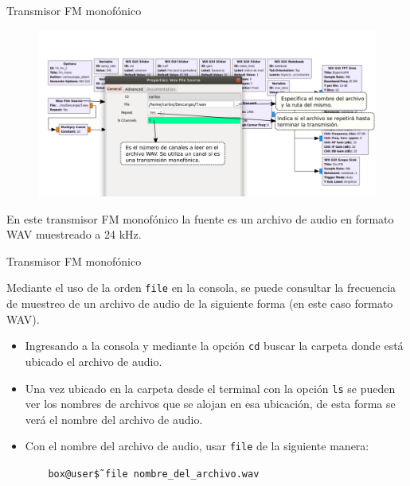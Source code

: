 \begin{frame}{Transmisor FM monofónico}

\begin{figure}[H]
\centering
\vspace{-3mm}
\includegraphics[width=\textwidth]{parte3/lab11/pdf/lab11_4.pdf}
\end{figure}

En este transmisor FM monofónico la fuente es un archivo de audio en formato WAV muestreado a 24 kHz.  

\end{frame}

\begin{frame}{Transmisor FM monofónico}

Mediante el uso de la orden \texttt{file} en la consola, se puede consultar la frecuencia de muestreo de un archivo de audio de la siguiente forma (en este caso formato WAV).

\begin{itemize}
    \item {Ingresando a la consola y mediante la opción \texttt{cd} buscar la carpeta donde está ubicado el archivo de audio.}
    \item {Una vez ubicado en la carpeta desde el terminal con la opción \texttt{ls} se pueden ver los nombres de archivos que se alojan en esa ubicación, de esta forma se verá el nombre del archivo de audio.}
    \item {Con el nombre del archivo de audio, usar \texttt{file} de la siguiente manera:  
}
    \begin{block}{}
    \texttt{
    \ \ \  box@user\~\$ file  nombre\_del\_archivo.wav}
    \end{block}
    
\end{itemize}{}

\end{frame}

